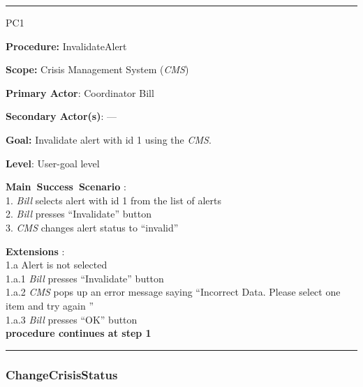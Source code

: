\vspace{0.5cm}
\hrule
\begin{lyxlist}{PC1}
\small{
\item [\textbf{Procedure:}] InvalidateAlert
\item [\textbf{Scope:}] Crisis Management System (\emph{CMS})
\item [\textbf{Primary Actor}:] Coordinator Bill
\item [\textbf{Secondary Actor(s)}:] ---
\item [\textbf{Goal:}] Invalidate alert with id 1 using the \emph{CMS}.
\item [\textbf{Level}:] User-goal level
\item [\textbf{Main~Success~Scenario}]:\\
1. \emph{Bill} selects alert with id 1 from the list of alerts\\
2. \emph{Bill} presses ``Invalidate'' button\\
3. \emph{CMS} changes alert status to ``invalid''\\

\item [\textbf{Extensions}]:\\
1.a Alert is not selected\\
\hspace*{0.5cm} 1.a.1 \emph{Bill} presses ``Invalidate'' button\\
\hspace*{0.5cm} 1.a.2 \emph{CMS} pops up an error message saying ``Incorrect
Data. Please select one item and try again ''\\
\hspace*{0.5cm} 1.a.3 \emph{Bill} presses ``OK'' button\\
\hspace*{0.5cm} \textbf{procedure continues at step 1}
}
\end{lyxlist}
\hrule
\vspace{0.5cm}

\subsubsection{ChangeCrisisStatus}

